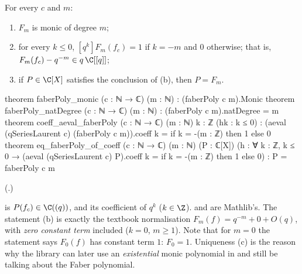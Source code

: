 \begin{theorem}\label{ch19:thm:faber}
For every $c$ and $m$:
\begin{enumerate}[label=(\alph*)]
\item $F_m$ is monic of degree $m$;
\item for every $k\le0$, $[q^k]F_m(f_c)=1$ if $k=-m$ and $0$ otherwise; that is, $F_m(f_c)-q^{-m}\in q\,\C[[q]]$;
\item if $P\in\C[X]$ satisfies the conclusion of (b), then $P=F_m$.
\end{enumerate}
\end{theorem}
\begin{leancode}
theorem faberPoly_monic (c : ℕ → ℂ) (m : ℕ) : (faberPoly c m).Monic
theorem faberPoly_natDegree (c : ℕ → ℂ) (m : ℕ) : (faberPoly c m).natDegree = m
theorem coeff_aeval_faberPoly (c : ℕ → ℂ) (m : ℕ) {k : ℤ} (hk : k ≤ 0) :
    (aeval (qSeriesLaurent c) (faberPoly c m)).coeff k = if k = -(m : ℤ) then 1 else 0
theorem eq_faberPoly_of_coeff (c : ℕ → ℂ) (m : ℕ) (P : ℂ[X])
    (h : ∀ k : ℤ, k ≤ 0 → (aeval (qSeriesLaurent c) P).coeff k = if k = -(m : ℤ) then 1 else 0) :
    P = faberPoly c m
\end{leancode}
(.)
\begin{dictionary}
 is $P(f_c)\in\C((q))$, and  its coefficient of $q^k$
($k\in\Z$).   and  are Mathlib's.  The statement (b) is exactly the textbook normalisation
$F_m(f)=q^{-m}+0+O(q)$, with \emph{zero constant term} included ($k=0$, $m\ge1$).  Note that for $m=0$ the
statement says $F_0(f)$ has constant term $1$: $F_0=1$.  Uniqueness (c) is the reason why the library can later use an
\emph{existential} monic polynomial in  and still be talking about the Faber polynomial.
\end{dictionary}
